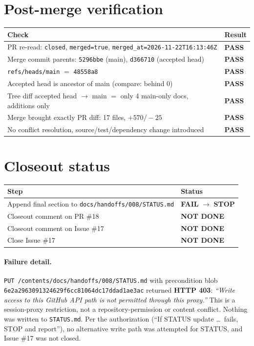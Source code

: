 \documentclass[11pt,a4paper]{article}
\newcommand{\sha}[1]{\texttt{\small #1}}
\newcommand{\PASS}{\textcolor{green!50!black}{\textbf{PASS}}}
\newcommand{\FAIL}{\textcolor{red!70!black}{\textbf{FAIL}}}
\newcommand{\STOP}{\textcolor{red!70!black}{\textbf{STOP}}}
\newcommand{\NOTDONE}{\textcolor{orange!80!black}{\textbf{NOT DONE}}}
\begin{document}
\section{Post-merge verification}
\begin{tabularx}{\textwidth}{@{}Xl@{}}
\toprule
Check & Result \\
\midrule
PR re-read: \texttt{closed}, \texttt{merged=true}, \texttt{merged\_at=2026-11-22T16:13:46Z} & \PASS \\
Merge commit parents: \sha{5296bbe} (main), \sha{d366710} (accepted head) & \PASS \\
\texttt{refs/heads/main} $=$ \sha{48558a8} & \PASS \\
Accepted head is ancestor of main (compare: behind 0) & \PASS \\
Tree diff accepted head $\to$ main $=$ only 4 main-only docs, additions only & \PASS \\
Merge brought exactly PR diff: 17 files, $+570/-25$ & \PASS \\
No conflict resolution, source/test/dependency change introduced & \PASS \\
\bottomrule
\end{tabularx}

\section{Closeout status}
\begin{tabularx}{\textwidth}{@{}Xl@{}}
\toprule
Step & Status \\
\midrule
Append final section to \texttt{docs/handoffs/008/STATUS.md} & \FAIL{} $\to$ \STOP \\
Closeout comment on PR \#18 & \NOTDONE \\
Closeout comment on Issue \#17 & \NOTDONE \\
Close Issue \#17 & \NOTDONE \\
\bottomrule
\end{tabularx}

\paragraph{Failure detail.} \texttt{PUT /contents/docs/handoffs/008/STATUS.md} with precondition blob \sha{6e2a2963091324629f6cc81064dc17ddad1ae3ac} returned \textbf{HTTP 403}: \emph{``Write access to this GitHub API path is not permitted through this proxy.''} This is a session-proxy restriction, not a repository-permission or content conflict. Nothing was written to \texttt{STATUS.md}. Per the authorization (``If STATUS update \ldots\ fails, STOP and report''), no alternative write path was attempted for STATUS, and Issue \#17 was not closed.
\end{document}

